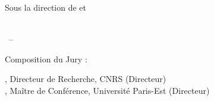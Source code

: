 \begin{titlepage}
\begin{addmargin}[-1cm]{-3cm}
\begin{center}
Sous la direction de \myProf et \myOtherProf \\ \medskip
\myDepartment \\  \medskip

\bigskip

\myTime\ -- \myVersion %

\bigskip

Composition du Jury :

, Directeur de Recherche, CNRS (Directeur)\\
, Maître de Conférence, Université Paris-Est (Directeur)\\

\vfill

\end{center}
\end{addmargin}

\end{titlepage}